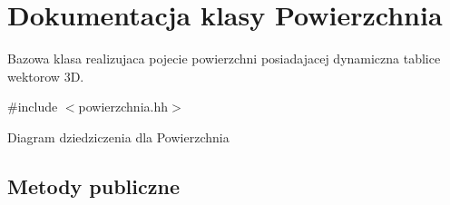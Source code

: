 \hypertarget{class_powierzchnia}{}\section{Dokumentacja klasy Powierzchnia}
\label{class_powierzchnia}


Bazowa klasa realizujaca pojecie powierzchni posiadajacej dynamiczna tablice wektorow 3D.  




{\ttfamily \#include $<$powierzchnia.\+hh$>$}



Diagram dziedziczenia dla Powierzchnia
\subsection*{Metody publiczne}
